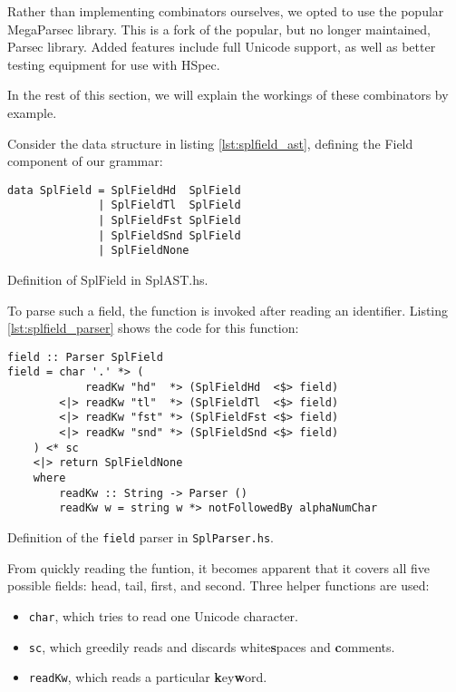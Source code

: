 Rather than implementing combinators ourselves, we opted to use the popular MegaParsec library.
This is a fork of the popular, but no longer maintained, Parsec library.
Added features include full Unicode support, as well as better testing equipment for use with HSpec.

In the rest of this section, we will explain the workings of these combinators by example.

Consider the data structure in listing \ref{lst:splfield_ast}, defining the \textsf{Field} component of our grammar:

\begin{listing}
\begin{verbatim}
data SplField = SplFieldHd  SplField
              | SplFieldTl  SplField
              | SplFieldFst SplField
              | SplFieldSnd SplField
              | SplFieldNone
\end{verbatim}
\caption{Definition of SplField in SplAST.hs.}
\label{lst:splfield_ast}
\end{listing}

To parse such a field, the  function is invoked after reading an identifier.
Listing \ref{lst:splfield_parser} shows the code for this function:

\begin{listing}
\begin{verbatim}
field :: Parser SplField
field = char '.' *> (
            readKw "hd"  *> (SplFieldHd  <$> field)
        <|> readKw "tl"  *> (SplFieldTl  <$> field)
        <|> readKw "fst" *> (SplFieldFst <$> field)
        <|> readKw "snd" *> (SplFieldSnd <$> field)
    ) <* sc
    <|> return SplFieldNone
    where
        readKw :: String -> Parser ()
        readKw w = string w *> notFollowedBy alphaNumChar
\end{verbatim}
\caption{Definition of the \texttt{field} parser in \texttt{SplParser.hs}.}
\label{lst:splfield_parser}
\end{listing}

From quickly reading the funtion, it becomes apparent that it covers all five possible fields: head, tail, first, and second.
Three helper functions are used:
\begin{itemize}
	\setlength{\itemsep}{0pt}
	\item \texttt{char}, which tries to read one Unicode character.
	\item \texttt{sc}, which greedily reads and discards white\textbf{s}paces and \textbf{c}omments.
	\item \texttt{readKw}, which reads a particular \textbf{k}ey\textbf{w}ord.
\end{itemize}

